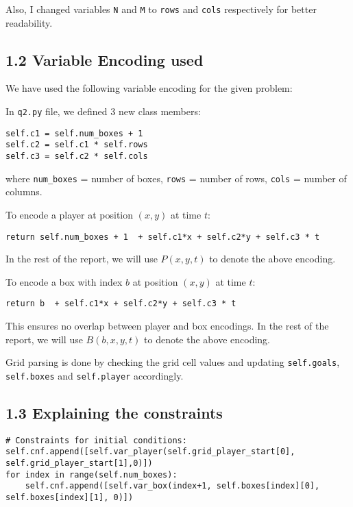 \documentclass[12pt,a4paper]{article}
\begin{document}
Also, I changed variables \texttt{N} and \texttt{M} to \texttt{rows} and \texttt{cols} respectively for better readability.

\subsection*{1.2 Variable Encoding used}

We have used the following variable encoding for the given problem:

In \texttt{q2.py} file, we defined 3 new class members:

\begin{lstlisting}
self.c1 = self.num_boxes + 1
self.c2 = self.c1 * self.rows
self.c3 = self.c2 * self.cols
\end{lstlisting}

where \texttt{num\_boxes} = number of boxes, \texttt{rows} = number of rows, \texttt{cols} = number of columns.

To encode a player at position \((x,y)\) at time \(t\):

\begin{lstlisting}
return self.num_boxes + 1  + self.c1*x + self.c2*y + self.c3 * t
\end{lstlisting}

In the rest of the report, we will use \(P(x,y,t)\) to denote the above encoding.

To encode a box with index \(b\) at position \((x,y)\) at time \(t\):

\begin{lstlisting}
return b  + self.c1*x + self.c2*y + self.c3 * t
\end{lstlisting}

This ensures no overlap between player and box encodings. In the rest of the report, we will use \(B(b,x,y,t)\) to denote the above encoding.

Grid parsing is done by checking the grid cell values and updating \texttt{self.goals}, \texttt{self.boxes} and \texttt{self.player} accordingly.
\newpage

\newpage

\subsection*{1.3 Explaining the constraints}

\begin{lstlisting}
# Constraints for initial conditions:
self.cnf.append([self.var_player(self.grid_player_start[0], self.grid_player_start[1],0)])
for index in range(self.num_boxes):
    self.cnf.append([self.var_box(index+1, self.boxes[index][0], self.boxes[index][1], 0)])
\end{lstlisting}
\end{document}
